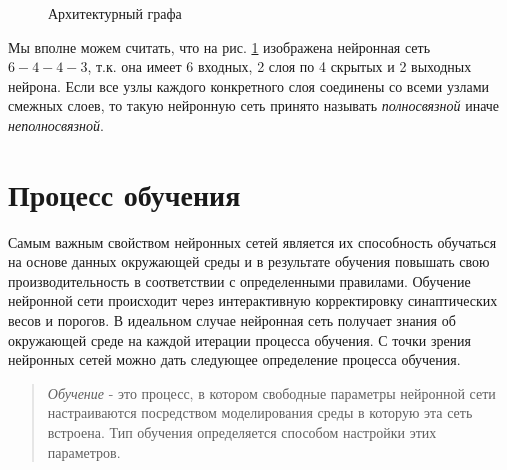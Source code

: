 \documentclass[a4paper,12pt]{report}
\begin{document}
\begin{figure}[!htb]
    \caption{Архитектурный графа}
    \label{fig:arch graph}
\end{figure}

Мы вполне можем считать, что на рис. \ref{fig:arch graph} изображена
нейронная сеть $6-4-4-3$, т.к. она имеет 6 входных, 2 слоя по 4
скрытых и 2 выходных нейрона. Если все узлы каждого конкретного слоя
соединены со всеми узлами смежных слоев, то такую нейронную сеть
принято называть \textit{полносвязной} иначе \textit{неполносвязной}.

\section{Процесс обучения}
Самым важным свойством нейронных сетей является их способность
обучаться на основе данных окружающей среды и в результате обучения
повышать свою производительность в соответствии с определенными
правилами. Обучение нейронной сети происходит через интерактивную
корректировку синаптических весов и порогов. В идеальном случае
нейронная сеть получает знания об окружающей среде на каждой итерации
процесса обучения. С точки зрения нейронных сетей можно дать следующее
определение процесса обучения.
\begin{quote}
    \textit{Обучение} - это процесс, в котором свободные параметры
    нейронной сети настраиваются посредством моделирования среды в
    которую эта сеть встроена. Тип обучения определяется способом
    настройки этих параметров.
\end{quote}
\end{document}
